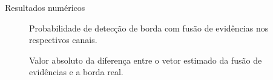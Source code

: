 \documentclass[10pt]{beamer}
\begin{document}
\begin{frame}{Resultados numéricos}
\begin{figure}[hbt]
	\caption{Probabilidade de detecção de borda com fusão de evidências nos respectivos canais.}
\label{cap_acf_fig13}
\endminipage\hfill
{}
	\caption{Valor absoluto da diferença entre o vetor estimado da fusão de evidências e a borda real.}
\label{cap_acf_fig14}
\endminipage\hfill
\end{figure}
\end{frame}
\end{document}
